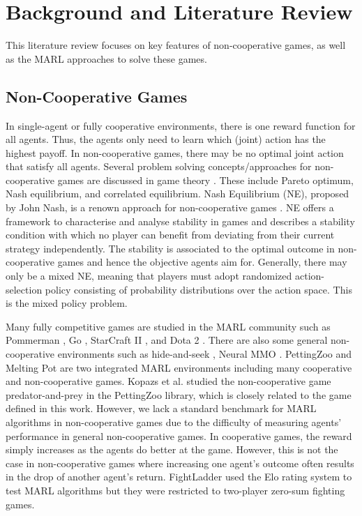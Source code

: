 \documentclass[]{interact}
\theoremstyle{plain}%
\theoremstyle{definition}
\theoremstyle{remark}
\begin{document}
\section{Background and Literature Review}
This literature review focuses on key features of non-cooperative games, as well as the MARL approaches to solve these games.

\subsection{Non-Cooperative Games}
In single-agent or fully cooperative environments, there is one reward function for all agents. Thus, the agents only need to learn which (joint) action has the highest payoff. In non-cooperative games, there may be no optimal joint action that satisfy all agents. Several problem solving concepts/approaches for non-cooperative games are discussed in game theory \cite{albrecht2024multi}. These include Pareto optimum, Nash equilibrium, and correlated equilibrium. Nash Equilibrium (NE), proposed by John Nash, is a renown approach for non-cooperative games \cite{nash2024non}. NE offers a framework to characterise and analyse stability in games and describes a stability condition with which no player can benefit from deviating from their current strategy independently. The stability is associated to the optimal outcome in non-cooperative games and hence the objective agents aim for. Generally, there may only be a mixed NE, meaning that players must adopt randomized action-selection policy consisting of probability distributions over the action space. This is the mixed policy problem.

Many fully competitive games are studied in the MARL community such as Pommerman \cite{resnick2018pommerman}, Go \cite{silver2017mastering}, StarCraft II \cite{vinyals2019grandmaster}, and Dota 2 \cite{berner2019dota}. There are also some general non-cooperative environments such as hide-and-seek \cite{baker2019emergent}, Neural MMO \cite{suarez2021neural}. PettingZoo and Melting Pot \cite{terry2021pettingzoo, leibo2021scalable} are two integrated MARL environments including many cooperative and non-cooperative games. Kopazs et al. \cite{kopacz2023evaluating} studied the non-cooperative game predator-and-prey in the PettingZoo library, which is closely related to the game defined in this work. However, we lack a standard benchmark for MARL algorithms in non-cooperative games due to the difficulty of measuring agents' performance in general non-cooperative games. In cooperative games, the reward simply increases as the agents do better at the game. However, this is not the case in non-cooperative games where increasing one agent's outcome often results in the drop of another agent's return. FightLadder \cite{li2024fightladder} used the Elo rating system to test MARL algorithms but they were restricted to two-player zero-sum fighting games.
\end{document}
